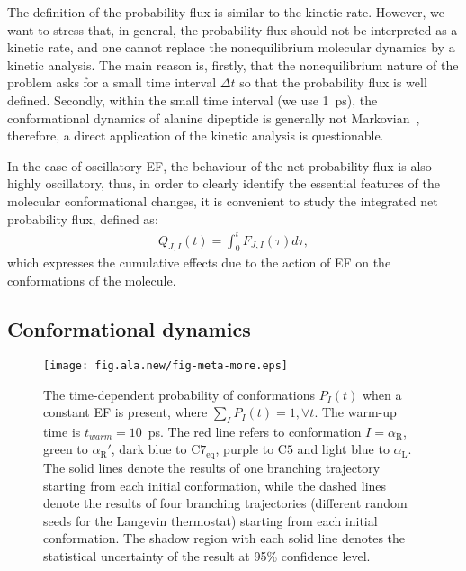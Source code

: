 \documentclass[a4paper,preprint,unsortedaddress,onecolumn]{revtex4-1}
\newcommand{\recheck}[1]{{\color{red} #1}}
\newcommand{\confaa}[0]{{\alpha_{\textrm{R}}}}
\newcommand{\confab}[0]{{\alpha_{\textrm{R}}'}}
\newcommand{\confba}[0]{{\textrm{C}7_{\textrm{eq}}}}
\newcommand{\confbb}[0]{{\textrm{C}5}}
\newcommand{\confc}[0]{{\alpha_{\textrm{L}}}}
\begin{document}
\recheck{ The definition of the probability flux is similar to the
  kinetic rate.  However, we want to stress that, in general, the
  probability flux should not be interpreted as a kinetic rate, and
  one cannot replace the nonequilibrium molecular dynamics by a
  kinetic analysis. The main reason is, firstly, that the nonequilibrium
  nature of the problem asks for a small time interval $\Delta t$ so that the probability flux is well defined.
  Secondly, within the small
  time interval (we use 1~ps), the conformational
  dynamics of alanine dipeptide is generally not Markovian~\cite{schuette2011markov, prinz2011markov},
  therefore, a direct application of the kinetic
  analysis is questionable.
}

In the case of oscillatory EF, the behaviour of the net probability flux is also highly oscillatory, thus, in order to clearly identify the essential features of the molecular conformational changes, it is convenient to study the integrated net probability flux, defined as:
\begin{align}\label{eqn:tmp7a}
  Q_{J,I} (t) = \int_0^t F_{J,I}(\tau)d \tau,
\end{align}
which expresses the cumulative effects due to the action of EF on the conformations of the molecule.


\subsection{Conformational dynamics}


\begin{figure}
  \centering
  \texttt{[image: fig.ala.new/fig-meta-more.eps]}
  \caption{The time-dependent probability of conformations $P_I(t)$ 
    when a constant EF is present, where $\sum_I P_I(t) = 1, \forall t$.
    The warm-up time is $t_{warm} = 10$~ps. The red line refers to conformation $I = \confaa$,
    green to $\confab$, dark blue to $\confba$, purple to $\confbb$ and light blue
    to $\confc$. \recheck{
      The solid lines denote the results of one branching trajectory
      starting from each initial conformation, while the dashed lines denote
      the results of four branching trajectories (different random seeds for the Langevin thermostat) starting from each initial
      conformation.
      The shadow region with each solid line denotes the
      statistical uncertainty of the result at 95\% confidence level.
    }
  }
  \label{fig:tmp5}
\end{figure}
\end{document}
